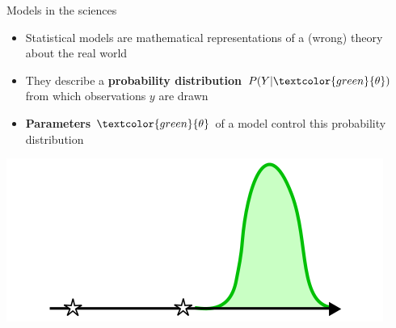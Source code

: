 \documentclass[10pt]{beamer}
\begin{document}
\begin{frame}{Models in the sciences}
  \begin{itemize}
   \item Statistical models are mathematical representations of a (wrong) theory about the real world
   \item They describe a \textbf{probability distribution} $P(Y|\textcolor{green}{\theta})$ from which observations $y$ are drawn
   \item \textbf{Parameters} $\textcolor{green}{\theta}$ of a model control this probability distribution
  \end{itemize}
  \centering
      \includegraphics[width=.8\textwidth]{camria-prob-5.png}
\end{frame}
\end{document}
